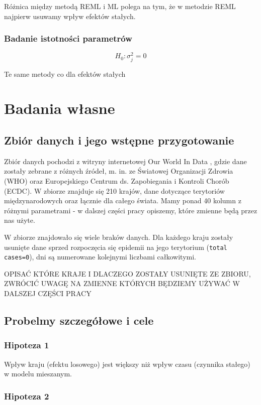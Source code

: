 \documentclass[12pt]{mwbk}
\theoremstyle{plain}
\theoremstyle{definition}
\theoremstyle{remark}
\begin{document}
Różnica między metodą REML i ML polega na tym, że w metodzie REML najpierw usuwamy wpływ efektów stałych.

\subsection{Badanie istotności parametrów}

$$H_0: \sigma^2_j=0$$

Te same metody co dla efektów stałych

\chapter{Badania własne}
\section{Zbiór danych i jego wstępne przygotowanie}

Zbiór danych pochodzi z witryny internetowej Our World In Data \cite{owid}, gdzie dane zostały zebrane z różnych źródeł, m. in. ze Światowej Organizacji Zdrowia (WHO) oraz Europejskiego Centrum ds. Zapobiegania i Kontroli Chorób (ECDC). W zbiorze znajduje się 210 krajów, dane dotyczące terytoriów międzynarodowych oraz łącznie dla całego świata. Mamy ponad 40 kolumn z różnymi parametrami - w dalszej części pracy opiszemy, które zmienne będą przez nas użyte.

W zbiorze znajdowało się wiele braków danych. Dla każdego kraju zostały usunięte dane sprzed rozpoczęcia się epidemii na jego terytorium (\texttt{total cases=0}), dni są numerowane kolejnymi liczbami całkowitymi.

OPISAĆ KTÓRE KRAJE I DLACZEGO ZOSTAŁY USUNIĘTE ZE ZBIORU, ZWRÓCIĆ UWAGĘ NA ZMIENNE KTÓRYCH BĘDZIEMY UŻYWAĆ W DALSZEJ CZĘŚCI PRACY


\section{Probelmy szczegółowe i cele}
\subsection{Hipoteza 1}
Wpływ kraju (efektu losowego) jest większy niż wpływ czasu (czynnika stałego) w modelu mieszanym.
\subsection{Hipoteza 2}
\end{document}
